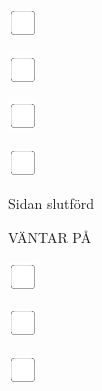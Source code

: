 \documentclass[11pt,titlepage]{article}
\begin{document}
\vspace{10mm}

\noindent
\includegraphics[]{checkbox-4mm.pdf}

\vspace{10mm}

\noindent
\includegraphics[]{checkbox-4mm.pdf}

\vspace{10mm}

\noindent
\includegraphics[]{checkbox-4mm.pdf}

\vspace{10mm}

\noindent
\includegraphics[]{checkbox-4mm.pdf}

\vspace{4mm}

\hfill Sidan slutförd \hspace{20mm}

\pagebreak

\small
\hfill VÄNTAR PÅ

\vspace{6mm}

\noindent
\includegraphics[]{checkbox-4mm.pdf}

\vspace{10mm}

\noindent
\includegraphics[]{checkbox-4mm.pdf}

\vspace{10mm}

\noindent
\includegraphics[]{checkbox-4mm.pdf}
\end{document}
